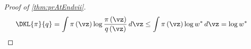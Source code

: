 \prAtEndRestatevii*
\label{proofsection:prAtEndvii}\begin{proof}[Proof of \autoref{thm:prAtEndvii}]\label{proof:prAtEndvii}\begin {align*} \DKL {\pi }{ q} = \int \pi \left (\vz \right ) \log \frac {\pi \left (\vz \right )}{q\left (\vz \right )}\,d\vz \leq \int \pi \left (\vz \right ) \log w^* \, d\vz = \log w^* \end {align*}\end{proof}
